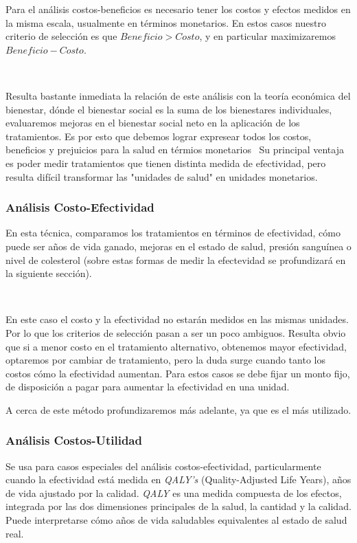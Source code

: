 \documentclass{article}
\begin{document}
Para el análisis costos-beneficios es necesario tener los costos y efectos medidos en la misma escala, usualmente en términos monetarios.
En estos casos nuestro criterio de selección es que $Beneficio > Costo$, y en particular maximizaremos $Beneficio-Costo$.

\

Resulta bastante inmediata la relación de este análisis con la teoría económica del bienestar, dónde el bienestar social es la suma de los bienestares individuales, evaluaremos mejoras en el bienestar social neto en la aplicación de los tratamientos. Es por esto que debemos lograr expresear todos los costos, beneficios y prejuicios para la salud en térmios monetarios
\
Su principal ventaja es poder medir tratamientos que tienen distinta medida de efectividad, pero resulta difícil transformar las "unidades de salud" en unidades monetarios.

\subsubsection{Análisis Costo-Efectividad}

En esta técnica, comparamos los tratamientos en términos de efectividad, cómo puede ser años de vida ganado, mejoras en el estado de salud, presión sanguínea o nivel de colesterol (sobre estas formas de medir la efectevidad se profundizará en la siguiente sección).

\

En este caso el costo y la efectividad no estarán medidos en las mismas unidades. Por lo que los criterios de selección pasan a ser un poco ambiguos. Resulta obvio que si a menor costo en el tratamiento alternativo, obtenemos mayor efectividad, optaremos por cambiar de tratamiento, pero la duda surge cuando tanto los costos cómo la efectividad aumentan. Para estos casos se debe fijar un monto fijo, de disposición a pagar para aumentar la efectividad en una unidad.

A cerca de este método profundizaremos más adelante, ya que es el más utilizado.

\subsubsection{Análisis Costos-Utilidad}

Se usa para casos especiales del análisis costos-efectividad, particularmente cuando la efectividad está medida en \textit{QALY's} (Quality-Adjusted Life Years), años de vida ajustado por la calidad.
\textit{QALY} es una medida compuesta de los efectos, integrada por las dos dimensiones principales de la salud, la cantidad y la calidad. Puede interpretarse cómo años de vida saludables equivalentes al estado de salud real.
\end{document}
